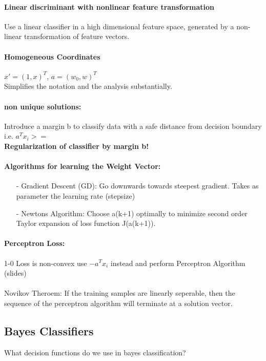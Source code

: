 \paragraph{Linear discriminant with nonlinear feature transformation}
Use a linear classifier in a high dimensional feature space, generated by a non-linear transformation of feature vectors.

\paragraph{Homogeneous Coordinates}
$x' = (1,x)^T$,  $a = (w_0,w)^T$\\
Simplifies the notation and the analysis substantially.

\paragraph{non unique solutions:} Introduce a margin b to classify data with a safe distance from decision boundary i.e. $a^Tx_i >= $\\
\textbf{Regularization of classifier by margin b!}

\paragraph{Algorithms for learning the Weight Vector:}
\begin{itemize}
    \item[-]Gradient Descent (GD): Go downwards towards steepest gradient. Takes as parameter the learning rate (stepsize)
    \item[-]Newtons Algorithm: Choose a(k+1) optimally to minimize second order Taylor expansion of loss function J(a(k+1)).
\end{itemize}

\paragraph{Perceptron Loss:} 1-0 Loss is non-convex use $-a^Tx_i$ instead
and perform Perceptron Algorithm (slides)\\
\\
Novikov Theroem: If the training samples are linearly seperable, then the sequence of the perceptron algorithm will terminate at a solution vector.

\subsection{Bayes Classifiers}
What decision functions do we use in bayes classification?

